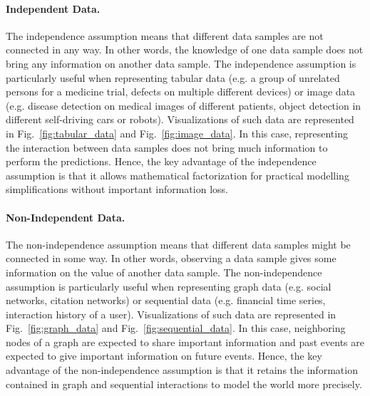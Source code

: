 \paragraph*{Independent Data.} The independence assumption means that different data samples are not connected in any way. In other words, the knowledge of one data sample does not bring any information on another data sample.
The independence assumption is particularly useful when representing tabular data \cite{raschka2022chronology} (e.g. a group of unrelated persons for a medicine trial, defects on multiple different devices) or image data \cite{lu2020survey, litjens2017survey} (e.g. disease detection on medical images of different patients, object detection in different self-driving cars or robots). Visualizations of such data are represented in Fig.~\ref{fig:tabular_data} and Fig.~\ref{fig:image_data}.
In this case, representing the interaction between data samples does not bring much information to perform the predictions.
Hence, the key advantage of the independence assumption is that it allows mathematical factorization for practical modelling simplifications \citep{bishop} without important information loss.

\paragraph*{Non-Independent Data.} The non-independence assumption means that different data samples might be connected in some way. In other words, observing a data sample gives some information on the value of another data sample.
The non-independence assumption is particularly useful when representing graph data \cite{GNNBook2022} (e.g. social networks, citation networks) or sequential data \cite{shchur2021review, Dietterich2002Machine} (e.g. financial time series, interaction history of a user). Visualizations of such data are represented in Fig.~\ref{fig:graph_data} and Fig.~\ref{fig:sequential_data}.
In this case, neighboring nodes of a graph are expected to share important information and past events are expected to give important information on future events.
Hence, the key advantage of the non-independence assumption is that it retains the information contained in graph and sequential interactions to model the world more precisely.

